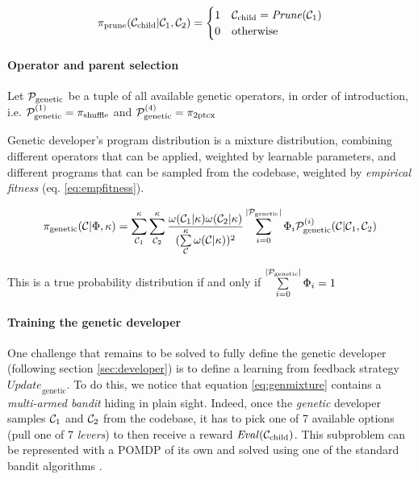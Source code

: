 \begin{equation}
    \pi_\text{prune}(\mathcal{C}_\text{child}|\mathcal{C}_1,\mathcal{C}_2)= \begin{cases}
        1 & \mathcal{C}_\text{child} = \mathit{Prune}(\mathcal{C}_1) \\
        0 & \text{otherwise}
        \end{cases}
\end{equation}

\paragraph{Operator and parent selection}

Let $\mathcal{P}_\text{genetic}$ be a tuple of all available genetic operators, in order of introduction, i.e. $\mathcal{P}_\text{genetic}^{(1)}=\pi_\text{shuffle}$ and $\mathcal{P}_\text{genetic}^{(4)}=\pi_\text{2ptcx}$

Genetic developer's program distribution is a mixture distribution, combining different operators that can be applied, weighted by learnable parameters, and different programs that can be sampled from the codebase, weighted by \emph{empirical fitness} (eq. \ref{eq:empfitness}).

\begin{equation}
    \pi_\text{genetic}(\mathcal{C} | \Phi, \kappa) = 
    \sum\limits_{\mathcal{C}_1}^{\kappa}  
    \sum\limits_{\mathcal{C}_2}^{\kappa} 
    \frac{\omega(\mathcal{C}_1|\kappa) \omega(\mathcal{C}_2|\kappa)}{(\sum\limits_{\mathcal{C}}^{\kappa} \omega(\mathcal{C}|\kappa))^2} 
    \sum\limits_{i=0}^{|\mathcal{P}_\text{genetic}|} 
    \Phi_i \mathcal{P}_\text{genetic}^{(i)} (\mathcal{C}|\mathcal{C}_1,\mathcal{C}_2)
    \label{eq:genmixture}
\end{equation}

This is a true probability distribution if and only if $\sum\limits_{i=0}^{|\mathcal{P}_\text{genetic}|} 
    \Phi_i = 1$


\paragraph{Training the genetic developer}

One challenge that remains to be solved to fully define the genetic developer (following section \ref{sec:developer}) is to define a learning from feedback strategy $\mathit{Update}_\text{genetic}$.
To do this, we notice that equation \ref{eq:genmixture} contains a \emph{multi-armed bandit} \cite{banditproblem} hiding in plain sight.
Indeed, once the \emph{genetic} developer samples $\mathcal{C}_1$ and $\mathcal{C}_2$ from the codebase, it has to pick one of 7 available options (pull one of 7 \emph{levers}) to then receive a reward $\mathit{Eval}(\mathcal{C}_\text{child})$.
This subproblem can be represented with a POMDP of its own and solved using one of the standard bandit algorithms \cite{banditsolutions}.

